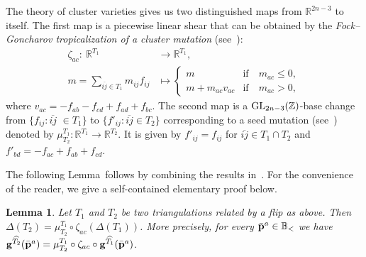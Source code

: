 \documentclass[pdftex]{sigma}%
\newtheorem{Lemma}[Theorem]{Lemma}
\numberwithin{equation}{section}
\begin{document}
The theory of cluster varieties gives us two distinguished maps from $\mathbb R^{2n-3} $ to itself. The first map is a piecewise linear shear that can be obtained by the {\it Fock--Goncharov tropicalization of a cluster mutation} (see~\cite[Definition~1.22]{GHKK}):\vspace{-.5ex}
\begin{align*}%
 \zeta_{ac}\colon\ \mathbb R^{T_1} &\to \mathbb R^{T_1},
 \\
 m=\sum_{\overline{ij}\in T_1} m_{ij}f_{ij} &\mapsto
 \begin{cases}
 m & \text{if}\quad m_{ac}\le 0,\\
 m+m_{ac}v_{ac} & \text{if}\quad m_{ac}>0,
 \end{cases}
\end{align*}
where $v_{ac}=-f_{ab}-f_{cd}+f_{ad}+f_{bc}$.
The second map is a ${\rm GL}_{2n-3}(\mathbb Z)$-base change from $\{f_{ij}\colon \overline{ij}$ $\in T_1\}$ to $\{f'_{ij}\colon \overline{ij}\in T_2\}$ corresponding to a seed mutation (see~\cite[equation~(8)]{FG_ensem}) denoted by $\mu^{T_1}_{T_2}\colon \mathbb R^{T_1} \to \mathbb R^{T_2}$.
It is given by $f'_{ij}=f_{ij}$ for $\overline{ij}\in T_1\cap T_2$ and $f'_{bd}=-f_{ac}+f_{ab}+f_{cd}$.

The following Lemma~follows by combining the results in~\cite[Sections~1.3 and~5]{GHKK}.
For the convenience of the reader, we give a self-contained elementary proof below.
\begin{Lemma}
Let $T_1$ and $T_2$ be two triangulations related by a flip as above.
Then $\Delta(T_2) = \mu^{T_1}_{T_2} \circ \zeta_{ac} (\Delta(T_1))$. More precisely, for every $\bar{\bf p}^a\in \mathbb B_{<}$ we have
${\bf g}^{\widehat{T_2}}(\bar {\bf p}^a) = \mu^{T_1}_{T_2} \circ \zeta_{ac} \circ {\bf g}^{\widehat{T_1}}(\bar {\bf p}^a)$.
\end{Lemma}
\end{document}
